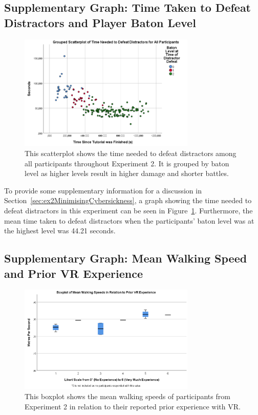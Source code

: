 \subsection{Supplementary Graph: Time Taken to Defeat Distractors and Player Baton Level}\label{sec:ex2distractorDefeatTimes}
\begin{figure}[tbph]
    \centering
    \includegraphics[width=0.75\textwidth]{figures/graphs/TimeSpentOnDistractorDefeat.png}
    \caption[Scatterplot Over Time Needed to Defeat Distractors in Experiment 2]{This scatterplot shows the time needed to defeat distractors among all participants throughout Experiment 2. It is grouped by baton level as higher levels result in higher damage and shorter battles.}
    \label{fig:ex2TimeNeededToDefeatDistractorsScatter}
\end{figure}
To provide some supplementary information for a discussion in Section~\ref{sec:ex2MinimisingCybersickness}, a graph showing the time needed to defeat distractors in this experiment can be seen in Figure~\ref{fig:ex2TimeNeededToDefeatDistractorsScatter}. Furthermore, the mean time taken to defeat distractors when the participants' baton level was at the highest level was 44.21 seconds.

\subsection{Supplementary Graph: Mean Walking Speed and Prior VR Experience}
\begin{figure}[tbph]
    \centering
    \includegraphics[width=0.75\textwidth]{figures/graphs/meanWalkingSpeedOverPriorVRExperience.png}
    \caption[Boxplot on Mean Walking Speed and Prior VR Experience in Experiment 2]{This boxplot shows the mean walking speeds of participants from Experiment 2 in relation to their reported prior experience with VR.}
    \label{fig:meanWalkingSpeedAndPriorExperience}
\end{figure}

